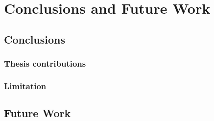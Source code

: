 \chapter{Conclusions and Future Work}

\section{Conclusions}
	\subsection{Thesis contributions}
		\lipsum[2]
	\subsection{Limitation}
		\lipsum[3]
\section{Future Work}